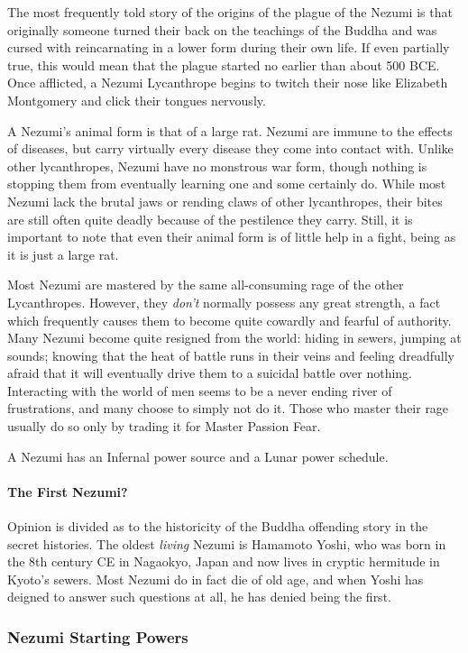 The most frequently told story of the origins of the plague of the Nezumi is that originally someone turned their back on the teachings of the Buddha and was cursed with reincarnating in a lower form during their own life. If even partially true, this would mean that the plague started no earlier than about 500 BCE. Once afflicted, a Nezumi Lycanthrope begins to twitch their nose like Elizabeth Montgomery and click their tongues nervously.

A Nezumi's animal form is that of a large rat. Nezumi are immune to the effects of diseases, but carry virtually every disease they come into contact with. Unlike other lycanthropes, Nezumi have no monstrous war form, though nothing is stopping them from eventually learning one and some certainly do. While most Nezumi lack the brutal jaws or rending claws of other lycanthropes, their bites are still often quite deadly because of the pestilence they carry. Still, it is important to note that even their animal form is of little help in a fight, being as it is just a large rat.

Most Nezumi are mastered by the same all-consuming rage of the other Lycanthropes. However, they \textit{don't} normally possess any great strength, a fact which frequently causes them to become quite cowardly and fearful of authority. Many Nezumi become quite resigned from the world: hiding in sewers, jumping at sounds; knowing that the heat of battle runs in their veins and feeling dreadfully afraid that it will eventually drive them to a suicidal battle over nothing. Interacting with the world of men seems to be a never ending river of frustrations, and many choose to simply not do it. Those who master their rage usually do so only by trading it for Master Passion Fear.

A Nezumi has an Infernal power source and a Lunar power schedule.

\paragraph{The First Nezumi?} Opinion is divided as to the historicity of the Buddha offending story in the secret histories. The oldest \textit{living} Nezumi is Hamamoto Yoshi, who was born in the 8th century CE in Nagaokyo, Japan and now lives in cryptic hermitude in Kyoto's sewers. Most Nezumi do in fact die of old age, and when Yoshi has deigned to answer such questions at all, he has denied being the first.

\subsubsection{Nezumi Starting Powers}

